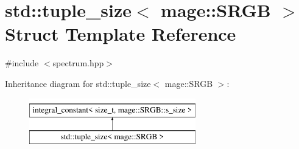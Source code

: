 \hypertarget{structstd_1_1tuple__size_3_01mage_1_1_s_r_g_b_01_4}{}\section{std\+:\+:tuple\+\_\+size$<$ mage\+:\+:S\+R\+GB $>$ Struct Template Reference}
\label{structstd_1_1tuple__size_3_01mage_1_1_s_r_g_b_01_4}


{\ttfamily \#include $<$spectrum.\+hpp$>$}

Inheritance diagram for std\+:\+:tuple\+\_\+size$<$ mage\+:\+:S\+R\+GB $>$\+:\begin{figure}[H]
\begin{center}
\leavevmode
\includegraphics[height=2.000000cm]{structstd_1_1tuple__size_3_01mage_1_1_s_r_g_b_01_4}
\end{center}
\end{figure}

